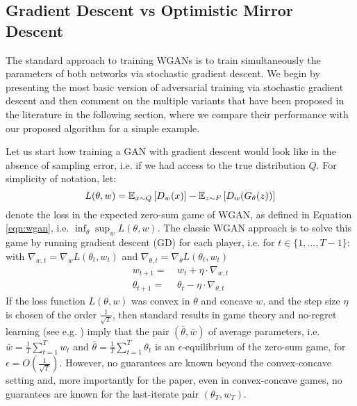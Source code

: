 \subsection{Gradient Descent vs Optimistic Mirror Descent}

The standard approach to training WGANs is to train simultaneously the parameters of both networks via stochastic gradient descent. We begin by presenting the most basic version of adversarial training via stochastic gradient descent and then comment on the multiple variants that have been proposed in the literature in the following section, where we compare their performance with our proposed algorithm for a simple example.

Let us start how training a GAN with gradient descent would look like in the absence of sampling error, i.e. if we had access to the true distribution $Q$. For simplicity of notation, let:
\begin{equation}\label{eqn:WGAN-loss}
L(\theta, w) = \mathbb{E}_{x\sim Q}\left[ D_w(x) \right] - \mathbb{E}_{z\sim F}\left[D_w(G_\theta(z))\right]
\end{equation}
denote the loss in the expected zero-sum game of WGAN, as defined in Equation \eqref{eqn:wgan}, i.e. $\inf_{\theta}\sup_{w} L(\theta,w)$. The classic WGAN approach is to solve this game by running gradient descent (GD) for each player, i.e. for $t\in \{1,\ldots, T-1\}$: with $\nabla_{w,t}=\nabla_w L(\theta_t, w_t)$ and $\nabla_{\theta, t} =\nabla_{\theta} L(\theta_t, w_t)$
\begin{equation}\label{eqn:GD}
\begin{aligned}
w_{t+1} =~& w_t + \eta \cdot \nabla_{w,t}\\
\theta_{t+1} =~& \theta_t - \eta \cdot \nabla_{\theta,t}
\end{aligned}
\end{equation}
If the loss function $L(\theta, w)$ was convex in $\theta$ and concave $w$,  and the step size $\eta$ is chosen of the order $\frac{1}{\sqrt{T}}$, then standard results in game theory and no-regret learning (see e.g. \cite{Freund1999}) imply that the pair $(\bar{\theta}, \bar{w})$ of average parameters, i.e. $\bar{w}=\frac{1}{T} \sum_{t=1}^T w_t$ and $\bar{\theta} = \frac{1}{T} \sum_{t=1}^T \theta_t$ is an $\epsilon$-equilibrium of the zero-sum game, for $\epsilon = O\left(\frac{1}{\sqrt{T}}\right)$. However, no guarantees are known beyond the convex-concave setting and, more importantly for the paper, even in convex-concave games, no guarantees are known for the last-iterate pair $(\theta_T, w_T)$.

